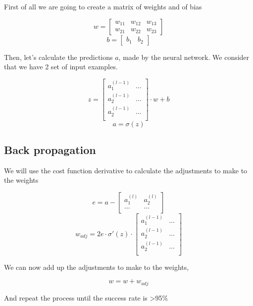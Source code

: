 \documentclass[]{report}
\begin{document}
{First of all we are going to create a matrix of weights and of bias}

\[w=\begin{bmatrix}
w_{11} & w_{12} & w_{13}\\
w_{21} & w_{22} & w_{23}
\end{bmatrix}\]
\[b=\begin{bmatrix}
b_{1} & b_{2}
\end{bmatrix}\]

{Then, let's calculate the predictions $a$, made by the neural network. We consider that we have 2 set of input examples.}

\[z=\begin{bmatrix}
a^{(l-1)}_1 & \ldots \\
a^{(l-1)}_2 & \ldots \\
a^{(l-1)}_2 & \ldots \\
\end{bmatrix}\cdot w+b\]
\[a=\sigma (z)\]

\subsection{Back propagation}

{We will use the cost function derivative to calculate the adjustments to make to the weights}

\[e=a-\begin{bmatrix}
a^{(l)}_1 & a^{(l)}_2 \\
\ldots & \ldots \\
\end{bmatrix}\]
\[w_{adj}=2e \cdot \sigma\prime (z)\cdot
\begin{bmatrix}
a^{(l-1)}_1 & \ldots \\
a^{(l-1)}_2 & \ldots \\
a^{(l-1)}_2 & \ldots \\
\end{bmatrix}\]

{We can now add up the adjustments to make to the weights,}

\[w=w+w_{adj}\]

{And repeat the process until the success rate is >95\%}
\end{document}
